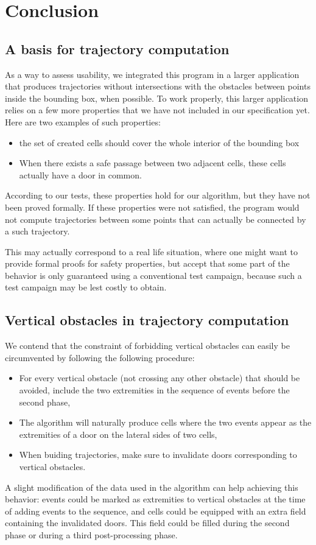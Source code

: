 \documentclass[a4paper, USenglish, cleveref, autoref, thm-restate]{lipics-v2021}
\begin{document}
\section{Conclusion}
\subsection{A basis for trajectory computation}
As a way to assess usability, we integrated this program in a larger
application that produces trajectories without intersections with
the obstacles between points inside the bounding
box, when possible.  To work properly, this larger application relies
on a few more properties that we have not included in our specification yet.
Here are two examples of such properties:
\begin{itemize}
\item the set of created cells should cover the whole interior of the
  bounding box
\item When there exists a safe passage between two adjacent cells, these
  cells actually have a door in common.
\end{itemize}
According to our tests, these properties hold for our algorithm, but
they have not been proved formally.  If these properties were not satisfied,
the program would not compute trajectories between some points that can
actually be connected by a such trajectory.

This may actually correspond to a real life situation, where one might
want to provide formal proofs for safety properties, but accept that some
part of the behavior is only guaranteed using a conventional test campaign,
because such a test campaign may be lest costly to obtain.

\subsection{Vertical obstacles in trajectory computation}
We contend that the constraint of forbidding vertical obstacles can easily
be circumvented by following the following procedure:
\begin{itemize}
\item For every vertical obstacle (not crossing any other obstacle) that
  should be avoided, include the two extremities in the sequence
  of events before the second phase,
\item The algorithm will naturally produce cells where the two events
  appear as the extremities of a door on the lateral sides of two
  cells,
\item When buiding trajectories, make sure to invalidate doors corresponding
  to vertical obstacles.
\end{itemize}
A slight modification of the data used in the algorithm can help achieving
this behavior: events could be marked as extremities to vertical obstacles
at the time of adding events to the sequence, and cells could be equipped
with an extra field containing the invalidated doors.  This field could
be filled during the second phase or during a third post-processing phase.
\end{document}
